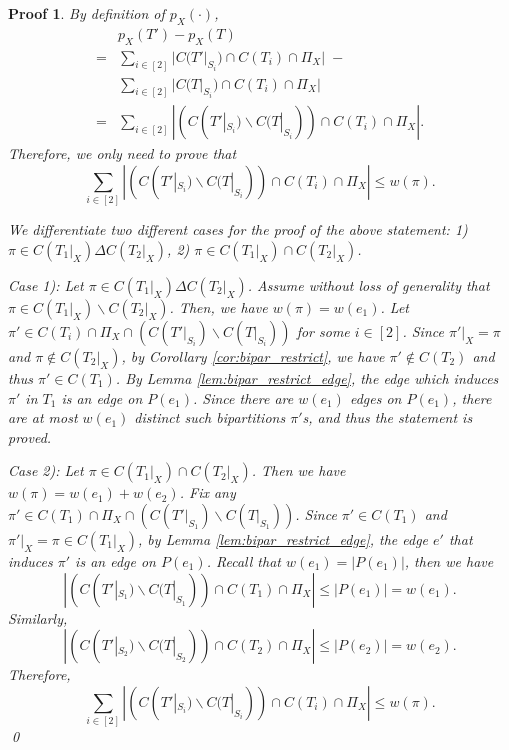 \documentclass[twocolumn]{bmcart}%
\theoremstyle{mystyle}
\theoremstyle{proofstyle}
\newtheorem*{proof2}{Proof}
\newenvironment{proofnospace}{\begin{proof2}}{\qed \end{proof2}}
\begin{document}
\lemOneBiparUpperbound*
\begin{proofnospace}
    By definition of $p_X(\cdot)$, 
    \begin{align*}
         & p_X(T') - p_X(T) \\
         =& \sum_{i \in [2]} |C(T'|_{S_i}) \cap C(T_i) \cap \Pi_X| \; - \\
         & \sum_{i \in [2]} |C(T|_{S_i}) \cap C(T_i) \cap \Pi_X| \\
        =& \sum_{i \in [2]}|(C(T'|_{S_i})\backslash C(T|_{S_i})) \cap C(T_i) \cap \Pi_X|.
    \end{align*}
    Therefore, we only need to prove that \[\sum_{i \in [2]}|(C(T'|_{S_i})\backslash C(T|_{S_i})) \cap C(T_i) \cap \Pi_X| \le w(\pi).\] 
    
    We differentiate two different cases for the proof of the above statement:  1) $\pi \in C(T_1|_X) \Delta C(T_2|_X)$, 2) $\pi \in C(T_1|_X) \cap C(T_2|_X)$. 
    
    Case 1): Let $\pi \in C(T_1|_X) \Delta C(T_2|_X)$. Assume without loss of generality that $\pi \in C(T_1|_X) \backslash C(T_2|_X)$. Then, we have $w(\pi) = w(e_1)$. Let $\pi'\in C(T_i) \cap \Pi_X \cap (C(T'|_{S_i})\backslash C(T|_{S_i}))$ for some $i \in [2]$. Since $\pi'|_X = \pi$ and $\pi \notin C(T_2|_X)$, by Corollary \ref{cor:bipar_restrict}, we have $\pi' \notin C(T_2)$ and thus $\pi' \in C(T_1)$. By Lemma \ref{lem:bipar_restrict_edge}, the edge which induces $\pi'$ in $T_1$ is an edge on $P(e_1)$. Since there are $w(e_1)$ edges on $P(e_1)$, there are at most $w(e_1)$ distinct such bipartitions $\pi'$s, and thus the statement is proved.
    
    Case 2): Let $\pi \in C(T_1|_X) \cap C(T_2|_X)$. Then we have $w(\pi) = w(e_1)+w(e_2)$. Fix any $\pi' \in C(T_1) \cap \Pi_X \cap  (C(T'|_{S_1})\backslash C(T|_{S_1}))$. Since $\pi' \in C(T_1)$ and $\pi'|_X = \pi \in C(T_1|_X)$, by Lemma \ref{lem:bipar_restrict_edge}, the edge $e'$ that induces $\pi'$ is an edge on $P(e_1)$. Recall that $w(e_1) = |P(e_1)|$, then we have \[|(C(T'|_{S_1})\backslash C(T|_{S_1})) \cap C(T_1) \cap \Pi_X| \le |P(e_1)| = w(e_1).\] Similarly, \[|(C(T'|_{S_2})\backslash C(T|_{S_2})) \cap C(T_2) \cap \Pi_X| \le |P(e_2)| = w(e_2).\] Therefore, \[\sum_{i \in [2]}|(C(T'|_{S_i})\backslash C(T|_{S_i})) \cap C(T_i) \cap \Pi_X| \le w(\pi).\]
\end{proofnospace}
\end{document}
